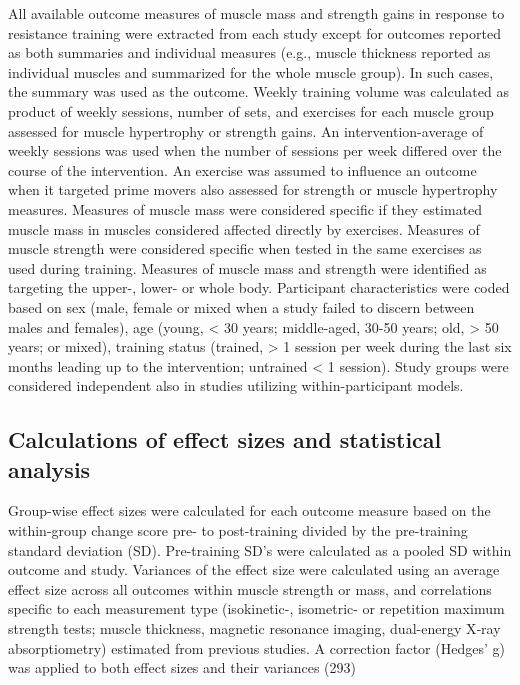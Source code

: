 \documentclass[twoside,10pt]{gihclass} %
\begin{document}
All available outcome measures of muscle mass and strength gains in
response to resistance training were extracted from each study except for outcomes reported as both summaries and individual measures (e.g., muscle thickness reported as individual muscles and summarized for the whole muscle group). In such cases, the summary was used as the outcome. Weekly training volume was calculated as product of weekly sessions, number of sets, and exercises for each muscle group assessed for muscle hypertrophy or strength gains. An intervention-average of weekly sessions was used when the number of sessions per week differed over the course of the intervention. An exercise was assumed to influence an outcome when it targeted prime movers also assessed for strength or muscle hypertrophy measures.
Measures of muscle mass were considered specific if they estimated muscle mass in muscles considered affected directly by exercises. Measures of muscle strength were considered specific when tested in the same exercises as used during training. Measures of muscle mass and strength were identified as targeting the upper-, lower- or whole body.
Participant characteristics were coded based on sex (male, female or mixed when a study failed to discern between males and females), age (young, \textless{} 30 years; middle-aged, 30-50 years; old, \textgreater{} 50 years; or mixed), training status (trained, \textgreater{} 1 session per week during the last six months leading up to the intervention; untrained \textless{} 1 session). Study groups were considered independent also in studies utilizing within-participant models.

\hypertarget{calculations-of-effect-sizes-and-statistical-analysis}{%
\subsection{Calculations of effect sizes and statistical analysis}\label{calculations-of-effect-sizes-and-statistical-analysis}}

Group-wise effect sizes were calculated for each outcome measure based
on the within-group change score pre- to post-training divided by the
pre-training standard deviation (SD). Pre-training SD's were calculated
as a pooled SD within outcome and study. Variances of the effect size
were calculated using an average effect size across all outcomes within
muscle strength or mass, and correlations specific to each measurement
type (isokinetic-, isometric- or repetition maximum strength tests;
muscle thickness, magnetic resonance imaging, dual-energy X‐ray
absorptiometry) estimated from previous studies.
A correction factor (Hedges' g) was applied to both effect sizes and their
variances
(293)
\end{document}
